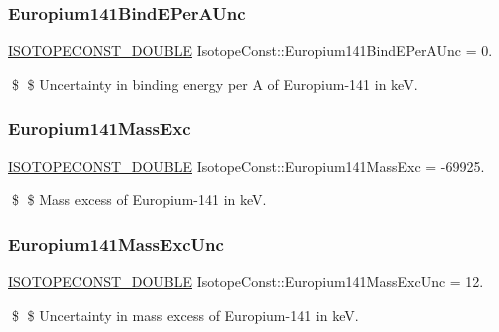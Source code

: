 \subsubsection{\texorpdfstring{Europium141\+Bind\+E\+Per\+A\+Unc}{Europium141BindEPerAUnc}}
{\footnotesize\ttfamily \mbox{\hyperlink{group___isotope_const-_macros_ga8f45a7272ce02c0b4c65c44636ed719a}{I\+S\+O\+T\+O\+P\+E\+C\+O\+N\+S\+T\+\_\+\+D\+O\+U\+B\+LE}} Isotope\+Const\+::\+Europium141\+Bind\+E\+Per\+A\+Unc = 0.}

\$ \$ Uncertainty in binding energy per A of Europium-\/141 in keV. \mbox{\label{group___isotope_const-_europium-_eu141_ga7aa13268183b1418b784fb2eea6e7d2e}} 
\subsubsection{\texorpdfstring{Europium141\+Mass\+Exc}{Europium141MassExc}}
{\footnotesize\ttfamily \mbox{\hyperlink{group___isotope_const-_macros_ga8f45a7272ce02c0b4c65c44636ed719a}{I\+S\+O\+T\+O\+P\+E\+C\+O\+N\+S\+T\+\_\+\+D\+O\+U\+B\+LE}} Isotope\+Const\+::\+Europium141\+Mass\+Exc = -\/69925.}

\$ \$ Mass excess of Europium-\/141 in keV. \mbox{\label{group___isotope_const-_europium-_eu141_ga798e8c8f68a7ee05bb7536e0fee4b234}} 
\subsubsection{\texorpdfstring{Europium141\+Mass\+Exc\+Unc}{Europium141MassExcUnc}}
{\footnotesize\ttfamily \mbox{\hyperlink{group___isotope_const-_macros_ga8f45a7272ce02c0b4c65c44636ed719a}{I\+S\+O\+T\+O\+P\+E\+C\+O\+N\+S\+T\+\_\+\+D\+O\+U\+B\+LE}} Isotope\+Const\+::\+Europium141\+Mass\+Exc\+Unc = 12.}

\$ \$ Uncertainty in mass excess of Europium-\/141 in keV. \mbox{\label{group___isotope_const-_europium-_eu141_gac227daff894af55cc0bdcb0413bedde4}} 

